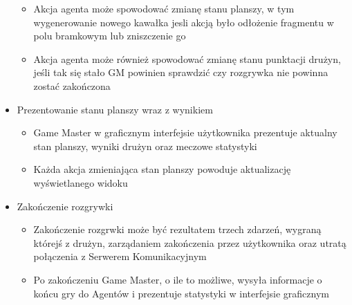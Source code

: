 \documentclass[../Dokumentacja.tex]{subfiles}
\begin{document}
\begin{itemize}
\begin{itemize}
		\item Akcja agenta może spowodować zmianę stanu planszy, w tym wygenerowanie nowego kawałka jesli akcją było odłożenie fragmentu w polu bramkowym lub zniszczenie go
		\item Akcja agenta może również spowodować zmianę stanu punktacji drużyn, jeśli tak się stało GM powinien sprawdzić czy rozgrywka nie powinna zostać zakończona
	\end{itemize}
	\item Prezentowanie stanu planszy wraz z wynikiem
	\begin{itemize}
		\item Game Master w graficznym interfejsie użytkownika prezentuje aktualny stan planszy, wyniki drużyn oraz meczowe statystyki
		\item Każda akcja zmieniająca stan planszy powoduje aktualizację wyświetlanego widoku
	\end{itemize}
	\item Zakończenie rozgrywki
	\begin{itemize}
		\item Zakończenie rozgrwki może być rezultatem trzech zdarzeń, wygraną którejś z drużyn, zarządaniem zakończenia przez użytkownika oraz utratą połączenia z Serwerem Komunikacyjnym
		\item Po zakończeniu Game Master, o ile to możliwe, wysyła informacje o końcu gry do Agentów i prezentuje statystyki w interfejsie graficznym
	\end{itemize}
\end{itemize}
\end{document}
